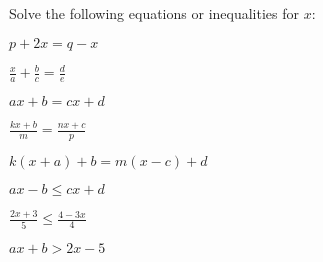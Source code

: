 \documentclass[10pt]{exam}
\begin{document}
Solve the following equations or inequalities for \(x\):

\begin{questions}
\begin{multicols}{2}

\question
\(p + 2x = q - x\)

\vspace{1in}

\question
\(\displaystyle \frac{x}{a} + \frac{b}{c} = \frac{d}{e}\)

\vspace{1.5in}

\question
\(ax + b = cx + d\)

\vspace{1.5in}

\question
\(\displaystyle \frac{kx + b}{m} = \frac{nx + c}{p}\)

\vspace{2in}

\question
\(k(x + a) + b = m(x - c) + d\)

\vspace{2in}

\question
\(ax - b \leq cx + d\)

\vspace{2in}

\question
\(\displaystyle \frac{2x + 3}{5} \leq \frac{4 - 3x}{4}\)

\vspace{2in}

\question
\(ax + b > 2x - 5\)

\vspace{2in}

\end{multicols}
\end{questions}
\end{document}
